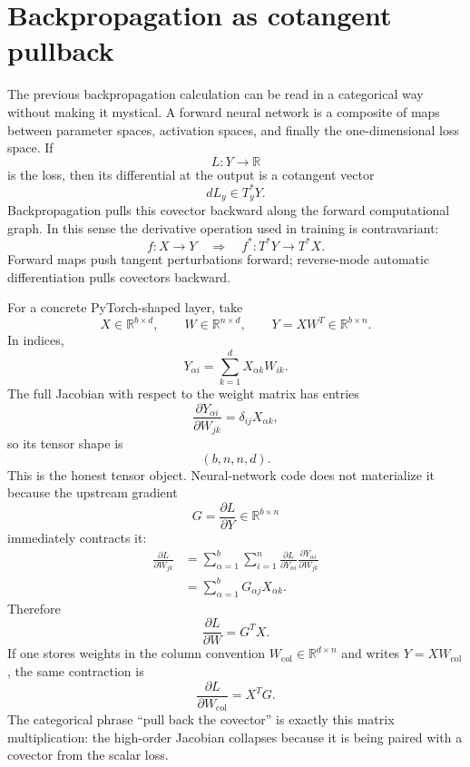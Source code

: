

\section{Backpropagation as cotangent pullback}

The previous backpropagation calculation can be read in a categorical way without making it mystical.  A forward neural network is a composite of maps between parameter spaces, activation spaces, and finally the one-dimensional loss space.  If
\[
  L:Y\to \mathbb R
\]
is the loss, then its differential at the output is a cotangent vector
\[
  dL_y\in T_y^*Y.
\]
Backpropagation pulls this covector backward along the forward computational graph.  In this sense the derivative operation used in training is contravariant:
\[
  f:X\to Y
  \quad\Longrightarrow\quad
  f^*:T^*Y\to T^*X.
\]
Forward maps push tangent perturbations forward; reverse-mode automatic differentiation pulls covectors backward.

For a concrete PyTorch-shaped layer, take
\[
  X\in\mathbb R^{b\times d},\qquad
  W\in\mathbb R^{n\times d},\qquad
  Y=XW^T\in\mathbb R^{b\times n}.
\]
In indices,
\[
  Y_{\alpha i}=\sum_{k=1}^d X_{\alpha k}W_{ik}.
\]
The full Jacobian with respect to the weight matrix has entries
\[
  \frac{\partial Y_{\alpha i}}{\partial W_{jk}}
  =\delta_{ij}X_{\alpha k},
\]
so its tensor shape is
\[
  (b,n,n,d).
\]
This is the honest tensor object.  Neural-network code does not materialize it because the upstream gradient
\[
  G=\frac{\partial L}{\partial Y}\in\mathbb R^{b\times n}
\]
immediately contracts it:
\[
\begin{aligned}
  \frac{\partial L}{\partial W_{jk}}
  &=
  \sum_{\alpha=1}^b\sum_{i=1}^n
  \frac{\partial L}{\partial Y_{\alpha i}}
  \frac{\partial Y_{\alpha i}}{\partial W_{jk}}\\
  &=
  \sum_{\alpha=1}^b G_{\alpha j}X_{\alpha k}.
\end{aligned}
\]
Therefore
\[
  \boxed{\displaystyle \frac{\partial L}{\partial W}=G^TX.}
\]
If one stores weights in the column convention \(W_{\mathrm{col}}\in\mathbb R^{d\times n}\) and writes \(Y=XW_{\mathrm{col}}\), the same contraction is
\[
  \frac{\partial L}{\partial W_{\mathrm{col}}}=X^TG.
\]
The categorical phrase ``pull back the covector'' is exactly this matrix multiplication: the high-order Jacobian collapses because it is being paired with a covector from the scalar loss.

